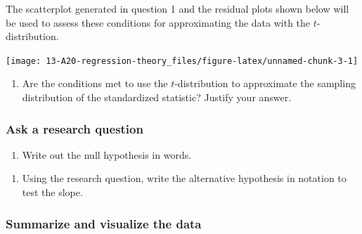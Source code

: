 \documentclass[
]{report}
\providecommand{\tightlist}{%
  \setlength{\itemsep}{0pt}\setlength{\parskip}{0pt}}
\begin{document}
The scatterplot generated in question 1 and the residual plots shown below will be used to assess these conditions for approximating the data with the \(t\)-distribution.

\begin{center}\texttt{[image: 13-A20-regression-theory\_files/figure-latex/unnamed-chunk-3-1]} \end{center}

\begin{enumerate}
\def\labelenumi{\arabic{enumi}.}
\setcounter{enumi}{1}
\tightlist
\item
  Are the conditions met to use the \(t\)-distribution to approximate the sampling distribution of the standardized statistic? Justify your answer.
\end{enumerate}

\vspace{1.5in}

\hypertarget{ask-a-research-question-6}{%
\subsubsection*{Ask a research question}\label{ask-a-research-question-6}}

\begin{enumerate}
\def\labelenumi{\arabic{enumi}.}
\setcounter{enumi}{2}
\tightlist
\item
  Write out the null hypothesis in words.
\end{enumerate}

\vspace{1in}

\begin{enumerate}
\def\labelenumi{\arabic{enumi}.}
\setcounter{enumi}{3}
\tightlist
\item
  Using the research question, write the alternative hypothesis in notation to test the slope.
\end{enumerate}

\vspace{0.5in}

\hypertarget{summarize-and-visualize-the-data-6}{%
\subsubsection*{Summarize and visualize the data}\label{summarize-and-visualize-the-data-6}}
\end{document}
